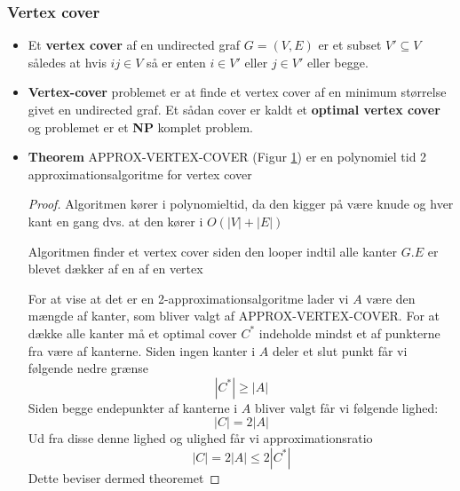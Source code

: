 \subsubsection{Vertex cover}
\begin{itemize}
\begin{figure}[ht]
	\centering
\begin{lstlisting}
APPROX-VERTEX-COVER(G)
  $C= \emptyset$
  $E' = G.E$
  while $E' \neq \emptyset$
    lad $(u,v)$ være en arbritær kant i $E'$ 
    $C = C \cup \{u,v\}$
    fjern fra $E'$ alle kanter til $u$ eller $v$ 
  return $C$
\end{lstlisting}
	\caption{Approximationsalgoritme til vertex cover problemet\label{fig:approx-vertex}}
\end{figure}

  \item Et \textbf{vertex cover} af en undirected graf $G=(V,E)$ er et subset $V' \subseteq V$ således at hvis $ij \in V$ så er enten $i \in V'$ eller $j \in V'$ eller begge. 
  \item \textbf{Vertex-cover} problemet er at finde et vertex cover af en minimum størrelse givet en undirected graf. Et sådan cover er kaldt et \textbf{optimal vertex cover} og problemet er et \textbf{NP} komplet problem. 
  \item \textbf{Theorem} APPROX-VERTEX-COVER (Figur \ref{fig:approx-vertex}) er en polynomiel tid 2 approximationsalgoritme for vertex cover
  \begin{proof} 
    Algoritmen kører i polynomieltid, da den kigger på være knude og hver kant en gang dvs. at den kører i $O(|V| + |E|)$ \smallskip
  
    Algoritmen finder et vertex cover siden den looper indtil alle kanter $G.E$ er blevet dækker af en af en vertex \smallskip

    For at vise at det er en 2-approximationsalgoritme lader vi $A$ være den mængde af kanter, som bliver valgt af APPROX-VERTEX-COVER. For at dække alle kanter må et optimal cover $C^*$ indeholde mindst et af punkterne fra være af kanterne. Siden ingen kanter i $A$ deler et slut punkt får vi følgende nedre grænse
    \begin{equation*}
      |C^*| \geq |A|  
    \end{equation*}
    Siden begge endepunkter af kanterne i $A$ bliver valgt får vi følgende lighed:
   \begin{equation*}
      |C| = 2|A| 
   \end{equation*}
    Ud fra disse denne lighed og ulighed får vi approximationsratio
    \begin{equation*}
      |C| = 2|A| \leq 2|C^*|
    \end{equation*}
    Dette beviser dermed theoremet

  \end{proof}
\end{itemize}

